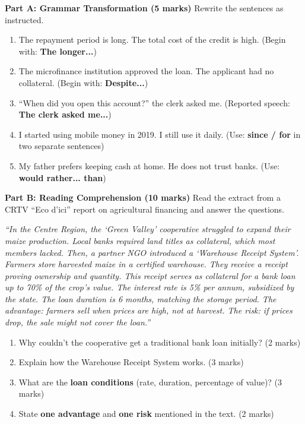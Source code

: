 \documentclass[11pt]{article}
\begin{document}
\begin{exercice}
\textbf{Part A: Grammar Transformation (5 marks)}
Rewrite the sentences as instructed.

\begin{enumerate}
    \item The repayment period is long. The total cost of the credit is high. \quad (Begin with: \textbf{The longer...})
    \item The microfinance institution approved the loan. The applicant had no collateral. \quad (Begin with: \textbf{Despite...})
    \item ``When did you open this account?'' the clerk asked me. \quad (Reported speech: \textbf{The clerk asked me...})
    \item I started using mobile money in 2019. I still use it daily. \quad (Use: \textbf{since / for} in two separate sentences)
    \item My father prefers keeping cash at home. He does not trust banks. \quad (Use: \textbf{would rather... than})
\end{enumerate}

\textbf{Part B: Reading Comprehension (10 marks)}
Read the extract from a CRTV ``Eco d'ici'' report on agricultural financing and answer the questions.

\emph{``In the Centre Region, the `Green Valley' cooperative struggled to expand their maize production. Local banks required land titles as collateral, which most members lacked. Then, a partner NGO introduced a `Warehouse Receipt System'. Farmers store harvested maize in a certified warehouse. They receive a receipt proving ownership and quantity. This receipt serves as collateral for a bank loan up to 70\% of the crop's value. The interest rate is 5\% per annum, subsidized by the state. The loan duration is 6 months, matching the storage period. The advantage: farmers sell when prices are high, not at harvest. The risk: if prices drop, the sale might not cover the loan.''}

\begin{enumerate}
    \item Why couldn't the cooperative get a traditional bank loan initially? (2 marks)
    \item Explain how the Warehouse Receipt System works. (3 marks)
    \item What are the \textbf{loan conditions} (rate, duration, percentage of value)? (3 marks)
    \item State \textbf{one advantage} and \textbf{one risk} mentioned in the text. (2 marks)
\end{enumerate}
\end{exercice}
\end{document}
